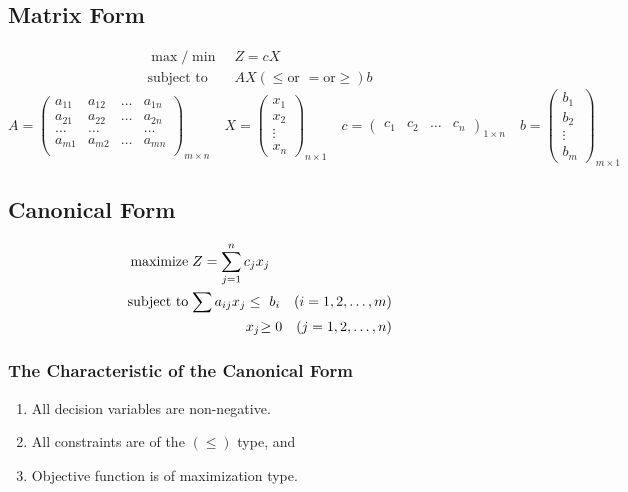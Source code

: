 \documentclass[../main-sheet.tex]{subfiles}
\begin{document}
\subsection{Matrix Form}
\begin{align*}
    \max/\min         & \; Z=cX                                    \\
    \text{subject to} & \; AX(\leq \text{or }  = \text{or} \geq) b
\end{align*}
\[
    A=\begin{pmatrix}
        a_{11} & a_{12} & \dots & a_{1n} \\
        a_{21} & a_{22} & \dots & a_{2n} \\
        \dots  & \dots  &       & \dots  \\
        a_{m1} & a_{m2} & \dots & a_{mn} \\
    \end{pmatrix}_{m\times n}
    \quad
    X=\begin{pmatrix}
        x_1    \\
        x_2    \\
        \vdots \\
        x_n
    \end{pmatrix}_{n\times 1}
    \quad
    c=\begin{pmatrix}
        c_1 & c_2 & \dots & c_n
    \end{pmatrix}_{1\times n}
    \quad
    b=\begin{pmatrix}
        b_1    \\
        b_2    \\
        \vdots \\
        b_m
    \end{pmatrix}_{m\times 1}
\]
\subsection{Canonical Form}
\begin{align*}
    \text{maximize}   & \; Z=\sum_{j=1}^n c_j x_j \\
    \text{subject to} & \;
    \begin{alignedat}[t]{2}
        \sum a_{ij}x_{j}& \leq & b_i\quad (i=1,2,\dots,m) \\
        &                   x_j &\geq0\quad(j=1,2,\dots,n)
    \end{alignedat}
\end{align*}
\subsubsection{The Characteristic of the Canonical Form}
\begin{enumerate}
    \item All decision variables are non-negative.
    \item All constraints are of the \((\leq)\) type, and
    \item Objective function is of maximization type.
\end{enumerate}
\end{document}
